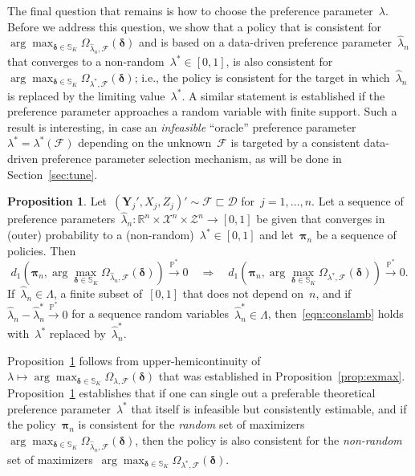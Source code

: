 \documentclass[11pt, a4paper]{article}
\newcommand{\R}{\mathbb{R}}
\newcommand{\cps}{\xrightarrow{\mathbb{P}^*}}
\theoremstyle{definition}
\newtheorem{proposition}[theorem]{Proposition}
\begin{document}
The final question that remains is how to choose the preference parameter~$\lambda$. Before we address this question, we show that a policy that is consistent for~$\arg\max_{\bm{\delta} \in \mathbb{S}_K} \Omega_{  \hat{\lambda}_n, \mathcal{F}}(\bm{\delta})$ and is based on a data-driven preference parameter~$\hat{\lambda}_n$ that converges to a non-random~$\lambda^* \in [0, 1]$, is also consistent for~$\arg\max_{\bm{\delta} \in \mathbb{S}_K} \Omega_{ \lambda^*, \mathcal{F}}(\bm{\delta})$; i.e., the policy is consistent for the target in which~$\hat{\lambda}_n$ is replaced by the limiting value~$\lambda^*$. A similar statement is established if the preference parameter approaches a random variable with finite support. Such a result is interesting, in case an \emph{infeasible} ``oracle'' preference parameter~$\lambda^* = \lambda^*(\mathcal{F})$ depending on the unknown~$\mathcal{F}$ is targeted by a consistent data-driven preference parameter selection mechanism, as will be done in Section~\ref{sec:tune}.
%
\begin{proposition}\label{prop:conslamb}
Let~$(\bm{Y}_j', X_j, Z_j)' \sim \mathcal{F} \sqsubset \mathscr{D}$ for~$j =1, \hdots, n$. Let a sequence of preference parameters~$\hat{\lambda}_n: \R^n \times \mathcal{X}^n \times \mathcal{Z}^n \to [0, 1]$ be given that converges in (outer) probability to a (non-random)~$\lambda^* \in [0, 1]$ and let~$\bm{\pi}_n$ be a sequence of policies. Then
%
\begin{equation}\label{eqn:conslamb}
d_1\left( \bm{\pi}_n, \arg\max_{\bm{\delta} \in \mathbb{S}_K} \Omega_{  \hat{\lambda}_n, \mathcal{F}}(\bm{\delta}) \right) \cps 0 \quad \Rightarrow \quad 
d_1\left( \bm{\pi}_n, \arg\max_{\bm{\delta} \in \mathbb{S}_K} \Omega_{ \lambda^*, \mathcal{F}}(\bm{\delta}) \right) \cps 0.
\end{equation}
%
If~$\hat{\lambda}_n \in \Lambda$, a finite subset of~$[0, 1]$ that does not depend on~$n$, and if~$\hat{\lambda}_n - \hat{\lambda}_n^* \cps 0$ for a sequence random variables~$\hat{\lambda}_n^* \in \Lambda$, then~\eqref{eqn:conslamb} holds with~$\lambda^*$ replaced by~$\hat{\lambda}_n^*$.
\end{proposition}  
%
Proposition~\ref{prop:conslamb} follows from upper-hemicontinuity of~$\lambda \mapsto 	\arg\max_{\bm{\delta} \in \mathbb{S}_K} \Omega_{  \lambda, \mathcal{F}}(\bm{\delta})$ that was established in Proposition~\ref{prop:exmax}.  Proposition~\ref{prop:conslamb} establishes that if one can single out a preferable theoretical preference parameter~$\lambda^*$ that itself is infeasible but consistently estimable, and if the policy~$\bm{\pi}_n$ is consistent for the \emph{random} set of maximizers~$\arg\max_{\bm{\delta} \in \mathbb{S}_K} \Omega_{  \hat{\lambda}_n, \mathcal{F}}(\bm{\delta})$, then the policy is also consistent for the \emph{non-random} set of maximizers~$\arg\max_{\bm{\delta} \in \mathbb{S}_K} \Omega_{  \lambda^*, \mathcal{F}}(\bm{\delta})$. 
\end{document}
